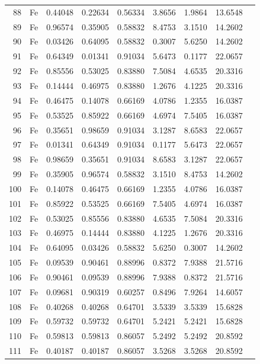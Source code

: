 \begin{longtable}{rlrrrrrrl}
88 & Fe & 0.44048 & 0.22634 & 0.56334 & 3.8656 & 1.9864 & 13.6548 &  \\
89 & Fe & 0.96574 & 0.35905 & 0.58832 & 8.4753 & 3.1510 & 14.2602 &  \\
90 & Fe & 0.03426 & 0.64095 & 0.58832 & 0.3007 & 5.6250 & 14.2602 &  \\
91 & Fe & 0.64349 & 0.01341 & 0.91034 & 5.6473 & 0.1177 & 22.0657 &  \\
92 & Fe & 0.85556 & 0.53025 & 0.83880 & 7.5084 & 4.6535 & 20.3316 &  \\
93 & Fe & 0.14444 & 0.46975 & 0.83880 & 1.2676 & 4.1225 & 20.3316 &  \\
94 & Fe & 0.46475 & 0.14078 & 0.66169 & 4.0786 & 1.2355 & 16.0387 &  \\
95 & Fe & 0.53525 & 0.85922 & 0.66169 & 4.6974 & 7.5405 & 16.0387 &  \\
96 & Fe & 0.35651 & 0.98659 & 0.91034 & 3.1287 & 8.6583 & 22.0657 &  \\
97 & Fe & 0.01341 & 0.64349 & 0.91034 & 0.1177 & 5.6473 & 22.0657 &  \\
98 & Fe & 0.98659 & 0.35651 & 0.91034 & 8.6583 & 3.1287 & 22.0657 &  \\
99 & Fe & 0.35905 & 0.96574 & 0.58832 & 3.1510 & 8.4753 & 14.2602 &  \\
100 & Fe & 0.14078 & 0.46475 & 0.66169 & 1.2355 & 4.0786 & 16.0387 &  \\
101 & Fe & 0.85922 & 0.53525 & 0.66169 & 7.5405 & 4.6974 & 16.0387 &  \\
102 & Fe & 0.53025 & 0.85556 & 0.83880 & 4.6535 & 7.5084 & 20.3316 &  \\
103 & Fe & 0.46975 & 0.14444 & 0.83880 & 4.1225 & 1.2676 & 20.3316 &  \\
104 & Fe & 0.64095 & 0.03426 & 0.58832 & 5.6250 & 0.3007 & 14.2602 &  \\
105 & Fe & 0.09539 & 0.90461 & 0.88996 & 0.8372 & 7.9388 & 21.5716 &  \\
106 & Fe & 0.90461 & 0.09539 & 0.88996 & 7.9388 & 0.8372 & 21.5716 &  \\
107 & Fe & 0.09681 & 0.90319 & 0.60257 & 0.8496 & 7.9264 & 14.6057 &  \\
108 & Fe & 0.40268 & 0.40268 & 0.64701 & 3.5339 & 3.5339 & 15.6828 &  \\
109 & Fe & 0.59732 & 0.59732 & 0.64701 & 5.2421 & 5.2421 & 15.6828 &  \\
110 & Fe & 0.59813 & 0.59813 & 0.86057 & 5.2492 & 5.2492 & 20.8592 &  \\
111 & Fe & 0.40187 & 0.40187 & 0.86057 & 3.5268 & 3.5268 & 20.8592 &  \\

\end{longtable}
